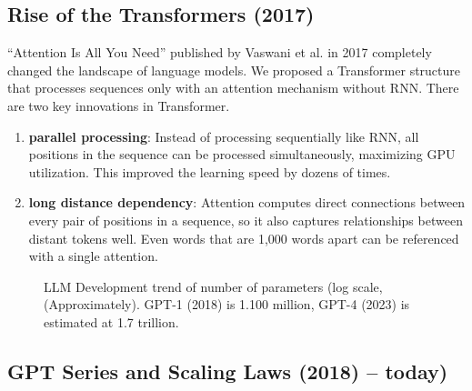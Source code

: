 \subsection{Rise of the Transformers (2017)}

``Attention Is All You Need'' published by Vaswani et al. in 2017 completely changed the landscape of language models. We proposed a Transformer structure that processes sequences only with an attention mechanism without RNN. There are two key innovations in Transformer.

\begin{enumerate}
\item\textbf{parallel processing}: Instead of processing sequentially like RNN, all positions in the sequence can be processed simultaneously, maximizing GPU utilization. This improved the learning speed by dozens of times.
\item\textbf{long distance dependency}: Attention computes direct connections between every pair of positions in a sequence, so it also captures relationships between distant tokens well. Even words that are 1,000 words apart can be referenced with a single attention.
\end{enumerate}

\begin{figure}[htbp]
\centering
{}
\caption{LLM Development trend of number of parameters (log scale, (Approximately). GPT-1 (2018) is 1.100 million, GPT-4 (2023) is estimated at 1.7 trillion.}
\label{fig:llm-scaling}
\end{figure}

\subsection{GPT Series and Scaling Laws (2018)  --  today)}

